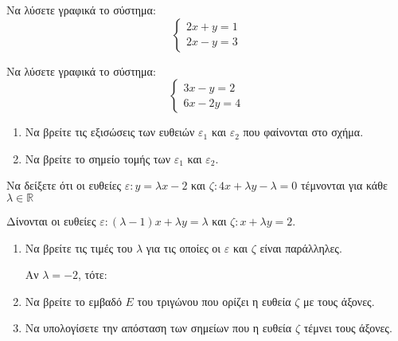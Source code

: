\documentclass{../presentation}
\begin{document}
\begin{askisi}
  Να λύσετε γραφικά το σύστημα: $$\begin{cases} 2x+y=1 \\ 2x-y=3 \end{cases}$$
\end{askisi}

\begin{askisi}
  Να λύσετε γραφικά το σύστημα: $$\begin{cases} 3x-y=2 \\ 6x-2y=4 \end{cases}$$
\end{askisi}

\begin{askisi}
  \begin{enumerate}
    \item Να βρείτε τις εξισώσεις των ευθειών $ε_1$ και $ε_2$ που φαίνονται στο σχήμα.
    \item Να βρείτε το σημείο τομής των $ε_1$ και $ε_2$.
  \end{enumerate}
\end{askisi}

\begin{askisi}
  Να δείξετε ότι οι ευθείες $ε:y=λx-2$ και $ζ:4x+λy-λ=0$ τέμνονται για κάθε $λ\in\mathbb{R}$
\end{askisi}

\begin{askisi}
  Δίνονται οι ευθείες $ε:(λ-1)x+λy=λ$ και $ζ:x+λy=2$.
  \begin{enumerate}[<+->]
    \item Να βρείτε τις τιμές του $λ$ για τις οποίες οι $ε$ και $ζ$ είναι παράλληλες.

          Αν $λ=-2$, τότε:
    \item Να βρείτε το εμβαδό $Ε$ του τριγώνου που ορίζει η ευθεία $ζ$ με τους άξονες.
    \item Να υπολογίσετε την απόσταση των σημείων που η ευθεία $ζ$ τέμνει τους άξονες.
  \end{enumerate}
\end{askisi}

\moodle
\end{document}
